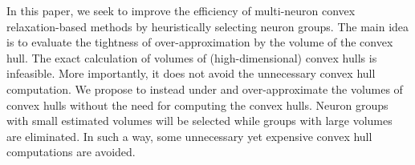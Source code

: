 \documentclass[runningheads]{llncs}
\newcommand{\prima}{\textsc{Prima}\xspace}
\newcommand{\krelu}{\textsc{kPoly}\xspace}
\begin{document}


In this paper, we seek to improve the efficiency of multi-neuron
convex relaxation-based methods by heuristically selecting neuron
groups. The main idea is to evaluate the tightness of over-approximation
by the volume of the convex hull. The exact calculation of volumes of
(high-dimensional) convex hulls is infeasible. More importantly, it
does not avoid the unnecessary convex hull computation. We propose to
instead under and over-approximate the volumes of convex hulls
without the need for computing the convex hulls. Neuron groups with
small estimated volumes will be selected while groups with large
volumes are eliminated. In such a way, some unnecessary yet expensive
convex hull computations are avoided.

\end{document}
